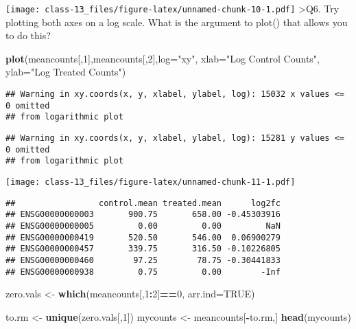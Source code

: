 \documentclass[
]{article}
\newenvironment{Shaded}{\begin{snugshade}}{\end{snugshade}}
\newcommand{\AttributeTok}[1]{\textcolor[rgb]{0.13,0.29,0.53}{#1}}
\newcommand{\ConstantTok}[1]{\textcolor[rgb]{0.56,0.35,0.01}{#1}}
\newcommand{\DecValTok}[1]{\textcolor[rgb]{0.00,0.00,0.81}{#1}}
\newcommand{\FunctionTok}[1]{\textcolor[rgb]{0.13,0.29,0.53}{\textbf{#1}}}
\newcommand{\NormalTok}[1]{#1}
\newcommand{\OtherTok}[1]{\textcolor[rgb]{0.56,0.35,0.01}{#1}}
\newcommand{\SpecialCharTok}[1]{\textcolor[rgb]{0.81,0.36,0.00}{\textbf{#1}}}
\newcommand{\StringTok}[1]{\textcolor[rgb]{0.31,0.60,0.02}{#1}}
\begin{document}
\texttt{[image: class-13\_files/figure-latex/unnamed-chunk-10-1.pdf]}
\textgreater Q6. Try plotting both axes on a log scale. What is the
argument to plot() that allows you to do this?

\begin{Shaded}
\begin{Highlighting}[]
\FunctionTok{plot}\NormalTok{(meancounts[,}\DecValTok{1}\NormalTok{],meancounts[,}\DecValTok{2}\NormalTok{],}\AttributeTok{log=}\StringTok{"xy"}\NormalTok{, }\AttributeTok{xlab=}\StringTok{"Log Control Counts"}\NormalTok{, }\AttributeTok{ylab=}\StringTok{"Log Treated Counts"}\NormalTok{)}
\end{Highlighting}
\end{Shaded}

\begin{verbatim}
## Warning in xy.coords(x, y, xlabel, ylabel, log): 15032 x values <= 0 omitted
## from logarithmic plot
\end{verbatim}

\begin{verbatim}
## Warning in xy.coords(x, y, xlabel, ylabel, log): 15281 y values <= 0 omitted
## from logarithmic plot
\end{verbatim}

\texttt{[image: class-13\_files/figure-latex/unnamed-chunk-11-1.pdf]}

\begin{Shaded}
\end{Shaded}

\begin{verbatim}
##                 control.mean treated.mean      log2fc
## ENSG00000000003       900.75       658.00 -0.45303916
## ENSG00000000005         0.00         0.00         NaN
## ENSG00000000419       520.50       546.00  0.06900279
## ENSG00000000457       339.75       316.50 -0.10226805
## ENSG00000000460        97.25        78.75 -0.30441833
## ENSG00000000938         0.75         0.00        -Inf
\end{verbatim}

\begin{Shaded}
\begin{Highlighting}[]
\NormalTok{zero.vals }\OtherTok{\textless{}{-}} \FunctionTok{which}\NormalTok{(meancounts[,}\DecValTok{1}\SpecialCharTok{:}\DecValTok{2}\NormalTok{]}\SpecialCharTok{==}\DecValTok{0}\NormalTok{, }\AttributeTok{arr.ind=}\ConstantTok{TRUE}\NormalTok{)}

\NormalTok{to.rm }\OtherTok{\textless{}{-}} \FunctionTok{unique}\NormalTok{(zero.vals[,}\DecValTok{1}\NormalTok{])}
\NormalTok{mycounts }\OtherTok{\textless{}{-}}\NormalTok{ meancounts[}\SpecialCharTok{{-}}\NormalTok{to.rm,]}
\FunctionTok{head}\NormalTok{(mycounts)}
\end{Highlighting}
\end{Shaded}
\end{document}
